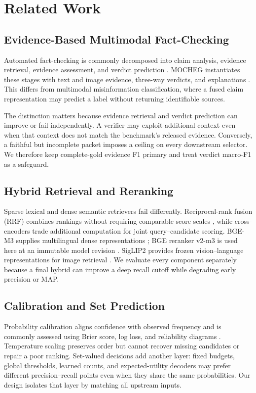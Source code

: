 \section{Related Work}

\subsection{Evidence-Based Multimodal Fact-Checking}

Automated fact-checking is commonly decomposed into claim analysis, evidence retrieval, evidence assessment, and verdict prediction \cite{zeng2021automated}. MOCHEG instantiates these stages with text and image evidence, three-way verdicts, and explanations \cite{yao2023mocheg}. This differs from multimodal misinformation classification, where a fused claim representation may predict a label without returning identifiable sources.

The distinction matters because evidence retrieval and verdict prediction can improve or fail independently. A verifier may exploit additional context even when that context does not match the benchmark's released evidence. Conversely, a faithful but incomplete packet imposes a ceiling on every downstream selector. We therefore keep complete-gold evidence F1 primary and treat verdict macro-F1 as a safeguard.

\subsection{Hybrid Retrieval and Reranking}

Sparse lexical and dense semantic retrievers fail differently. Reciprocal-rank fusion (RRF) combines rankings without requiring comparable score scales \cite{cormack2009rrf}, while cross-encoders trade additional computation for joint query--candidate scoring. BGE-M3 supplies multilingual dense representations \cite{chen2024bgem3}; BGE reranker v2-m3 is used here at an immutable model revision \cite{bgereranker}. SigLIP2 provides frozen vision--language representations for image retrieval \cite{tschannen2025siglip2}. We evaluate every component separately because a final hybrid can improve a deep recall cutoff while degrading early precision or MAP.

\subsection{Calibration and Set Prediction}

Probability calibration aligns confidence with observed frequency and is commonly assessed using Brier score, log loss, and reliability diagrams \cite{guo2017calibration}. Temperature scaling preserves order but cannot recover missing candidates or repair a poor ranking. Set-valued decisions add another layer: fixed budgets, global thresholds, learned counts, and expected-utility decoders may prefer different precision--recall points even when they share the same probabilities. Our design isolates that layer by matching all upstream inputs.

